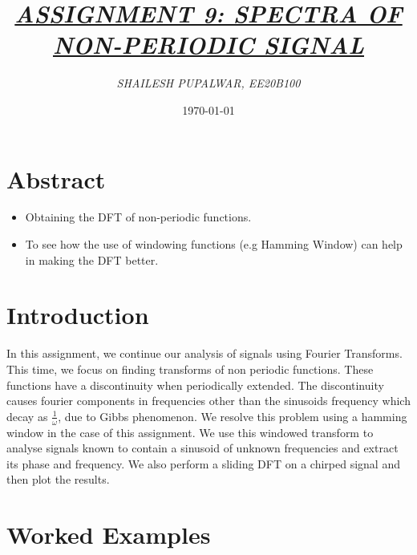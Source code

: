 \documentclass{article}
\title{\underline{\textit{\Large{ASSIGNMENT 9: SPECTRA OF NON-PERIODIC SIGNAL}}}}
\author{\textit{ SHAILESH PUPALWAR, EE20B100 }}
\date{\today}
\begin{document}
\maketitle

\section{Abstract}
\begin{itemize}
\item Obtaining the DFT of non-periodic functions.
\item To see how the use of windowing functions (e.g Hamming Window) can help in making the DFT better.
\end{itemize}

\section{Introduction}
In this assignment, we continue our analysis of signals using Fourier Transforms. This time, we focus on finding transforms of non periodic functions. These functions have a discontinuity when periodically extended.\newline 
The discontinuity causes fourier components in frequencies other than the sinusoids frequency which decay as
\(\frac{1}{\omega}\), due to Gibbs phenomenon. We resolve this problem using a hamming window in the case of this assignment.\newline 
We use this windowed transform to analyse signals known to contain a sinusoid of unknown frequencies and extract its phase and frequency. We also perform a sliding DFT on a chirped signal and then plot the results.

\section {Worked Examples}
\end{document}
